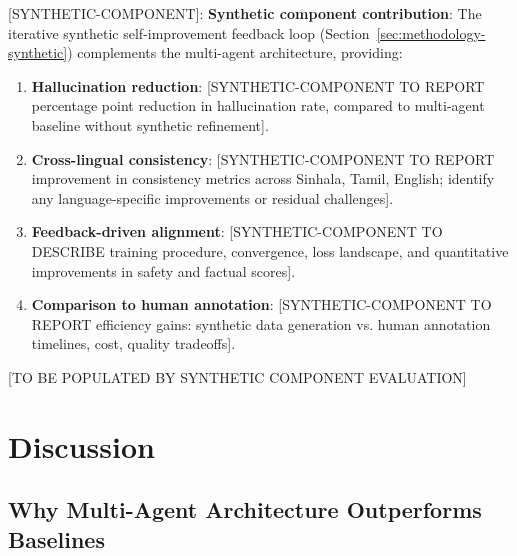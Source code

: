 \documentclass[11pt,a4paper]{article}
\newcommand{\synthetic}[1]{{\colorbox{syntheticcolor}{[SYNTHETIC-COMPONENT]: #1}}}
\begin{document}
\synthetic{
\textbf{Synthetic component contribution}: The iterative synthetic self-improvement feedback loop (Section~\ref{sec:methodology-synthetic}) complements the multi-agent architecture, providing:

\begin{enumerate}
    \item \textbf{Hallucination reduction}: [SYNTHETIC-COMPONENT TO REPORT percentage point reduction in hallucination rate, compared to multi-agent baseline without synthetic refinement].
    
    \item \textbf{Cross-lingual consistency}: [SYNTHETIC-COMPONENT TO REPORT improvement in consistency metrics across Sinhala, Tamil, English; identify any language-specific improvements or residual challenges].
    
    \item \textbf{Feedback-driven alignment}: [SYNTHETIC-COMPONENT TO DESCRIBE training procedure, convergence, loss landscape, and quantitative improvements in safety and factual scores].
    
    \item \textbf{Comparison to human annotation}: [SYNTHETIC-COMPONENT TO REPORT efficiency gains: synthetic data generation vs. human annotation timelines, cost, quality tradeoffs].
\end{enumerate}

[TO BE POPULATED BY SYNTHETIC COMPONENT EVALUATION]
}

\section{Discussion}

\subsection{Why Multi-Agent Architecture Outperforms Baselines}
\label{sec:discussion-advantages}
\end{document}
